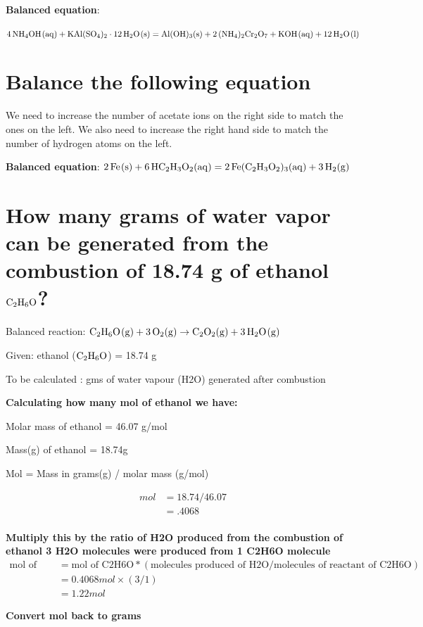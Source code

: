 \documentclass{scrartcl}
\begin{document}
\textbf{Balanced equation}:

\(\ce{4NH4OH(aq) + KAl(SO4)2} \cdot \ce{12H2O(s)} = \ce{Al(OH)3(s)} +
\ce{2(NH4)2Cr2O7 + KOH(aq)} + \ce{12H2O(l)}\)

\section{Balance the following equation}
\label{sec:org5a12676}
We need to increase the number of acetate ions on the right side to match the
ones on the left. We also need to increase the right hand side to match the
number of hydrogen atoms on the left.

\textbf{Balanced equation}:
\(\ce{2Fe(s)}+\ce{6HC2H3O2(aq)}=\ce{2Fe(C2H3O2)3(aq)}+\ce{3H2(g)}\)

\section{How many grams of water vapor can be generated from the combustion of 18.74 g of ethanol \(\ce{C2H6O}\)?}
\label{sec:orgdb858f2}
Balanced reaction:
\(\ce{C2H6O(g) + 3O2(g)} \rightarrow \ce{C2O2(g) + 3H2O(g)}\)

Given: ethanol (\(\ce{C2H6O}\)) =  18.74 g

To be calculated : gms of water vapour (H2O) generated after combustion

\textbf{Calculating how many mol of ethanol we have:}

Molar mass of ethanol = 46.07 g/mol

Mass(g) of ethanol = 18.74g

Mol = Mass in grams(g) / molar mass (g/mol)

\begin{align*}
mol&=18.74/46.07\\
&=.4068\\
\end{align*}

\textbf{Multiply this by the ratio of H2O produced from the combustion of ethanol 3 H2O molecules were produced from 1 C2H6O molecule}
\begin{align*}
\text{mol of H2O}&=\text{mol of C2H6O} * (\text{molecules produced of H2O}/\text{molecules of reactant of C2H6O})\\
&=0.4068mol \times (3/1)\\
&=1.22mol
\end{align*}

\textbf{Convert mol back to grams}
\end{document}
